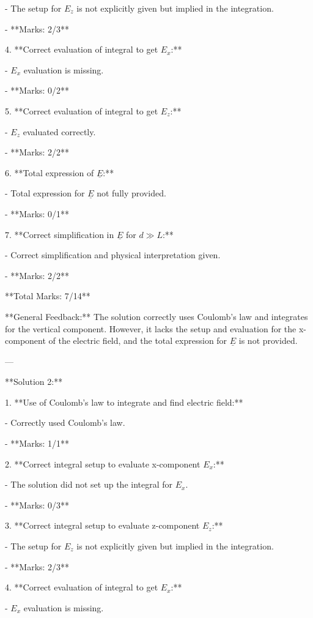 \documentclass[a4paper,11pt]{article}
\begin{document}
   - The setup for \(E_z\) is not explicitly given but implied in the integration.
   
   - **Marks: 2/3**

4. **Correct evaluation of integral to get \(E_x\):**

   - \(E_x\) evaluation is missing.
   
   - **Marks: 0/2**

5. **Correct evaluation of integral to get \(E_z\):**

   - \(E_z\) evaluated correctly.
   
   - **Marks: 2/2**

6. **Total expression of \(\underline{E}\):**

   - Total expression for \( \underline{E} \) not fully provided.
   
   - **Marks: 0/1**

7. **Correct simplification in \(\underline{E}\) for \( d \gg L \):**

   - Correct simplification and physical interpretation given.
   
   - **Marks: 2/2**

   **Total Marks: 7/14**

**General Feedback:** The solution correctly uses Coulomb's law and integrates for the vertical component. However, it lacks the setup and evaluation for the x-component of the electric field, and the total expression for \(\underline{E}\) is not provided.

---

**Solution 2:**

1. **Use of Coulomb's law to integrate and find electric field:**

   - Correctly used Coulomb's law.
   
   - **Marks: 1/1**

2. **Correct integral setup to evaluate x-component \(E_x\):**

   - The solution did not set up the integral for \(E_x\).
   
   - **Marks: 0/3**

3. **Correct integral setup to evaluate z-component \(E_z\):**

   - The setup for \(E_z\) is not explicitly given but implied in the integration.
   
   - **Marks: 2/3**

4. **Correct evaluation of integral to get \(E_x\):**

   - \(E_x\) evaluation is missing.
   
\end{document}
